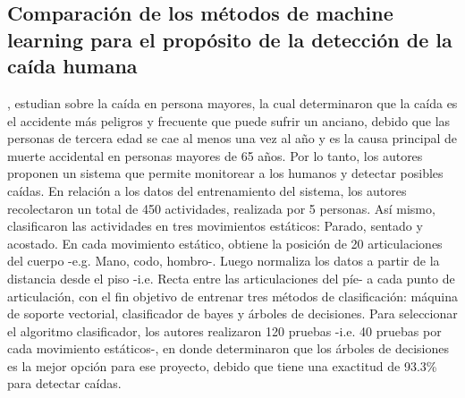 \subsection{Comparaci\'on de los m\'etodos de machine learning para el prop\'osito de la detecci\'on de la ca\'ida humana} \label{tr:4}
, estudian sobre la  ca\'ida en persona mayores, la cual determinaron que la ca\'ida  es el accidente m\'as peligros y frecuente que puede sufrir un anciano, debido que las personas de tercera edad se cae al menos una vez al a\~no y es la causa principal de muerte accidental en personas mayores de 65 a\~nos. Por lo tanto, los autores proponen un sistema que permite monitorear a los humanos y detectar posibles ca\'idas.
\medbreak
En relaci\'on a los datos del entrenamiento del sistema, los autores recolectaron un total de 450 actividades, realizada por 5 personas. As\'i mismo, clasificaron las actividades en tres movimientos est\'aticos: Parado, sentado y acostado. En cada movimiento est\'atico, obtiene la posici\'on de 20 articulaciones del cuerpo -e.g. Mano, codo, hombro-. Luego normaliza los datos a partir de la distancia desde el piso -i.e. Recta entre las articulaciones del p\'ie- a cada punto de articulaci\'on, con el fin objetivo de entrenar tres m\'etodos de clasificaci\'on: m\'aquina de soporte vectorial, clasificador de bayes y \'arboles de decisiones.
\medbreak
Para seleccionar el algoritmo clasificador, los autores realizaron 120 pruebas -i.e. 40 pruebas por cada movimiento est\'aticos-, en donde determinaron  que los \'arboles de decisiones es la mejor opci\'on para ese proyecto, debido que tiene una exactitud de 93.3\% para detectar ca\'idas.
